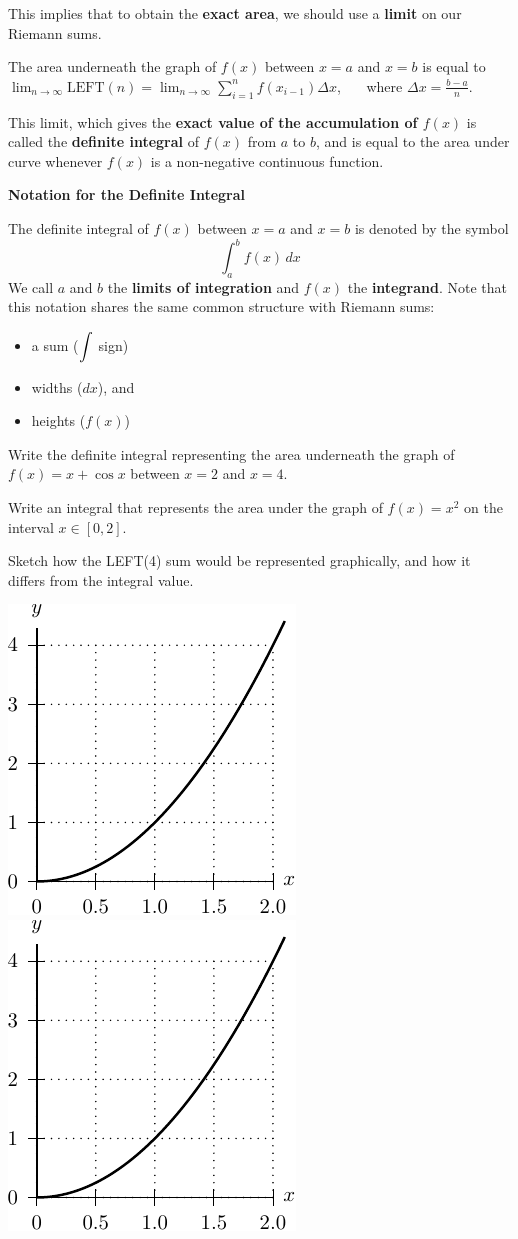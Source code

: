 This implies that to obtain the {\bf
  exact area}, we should use a {\bf limit} on our Riemann sums.

\medskip
\begin{center}
The area underneath the graph of $f(x)$ between $x=a$ and $x=b$ is equal to $\displaystyle\lim_{n \to \infty} \mbox{LEFT}(n) = 
\displaystyle\lim_{n \to \infty} \displaystyle\sum_{i=1}^{n} f(x_{i-1})\Delta x$, ~~~where $\Delta x = \displaystyle\frac{b-a}{n}$.
\end{center}

This limit, which gives the {\bf exact value of the accumulation of
  $f(x)$} is called the {\bf definite integral} of $f(x)$ from $a$ to
$b$, and is equal to the area under curve whenever $f(x)$ is a
non-negative continuous function.

  {\bf{Notation for the Definite Integral}} 
  
  The definite integral of $f(x)$ between $x=a$ and $x=b$ is denoted
  by the symbol $$\int_a^b f(x) \,dx$$ We call $a$ and $b$ the
  {\bf{limits of integration}} and $f(x)$ the {\bf{integrand}}.  Note
  that this notation shares the same common structure with Riemann
  sums:
\begin{itemize}
\item a sum ($\displaystyle \int $ sign) \\
\item widths ($dx$), and \\
\item heights ($f(x)$)
\end{itemize}

\newpage 

\problem Write the definite integral representing the area underneath
  the graph of $f(x) = x + \cos x$ between $x=2$ and $x=4$.

\vfill

\newpage
\problem Write an integral that represents the area under the graph of
$f(x) = x^2$ on the interval $x \in [0, 2]$.

\vfill \problem Sketch how the LEFT(4) sum would be represented
graphically, and how it differs from the integral value.

\includegraphics[width=0.3\linewidth]{graphics/notes_04_parabola_for_areas}
\hfill
\includegraphics[width=0.3\linewidth]{graphics/notes_04_parabola_for_areas}



